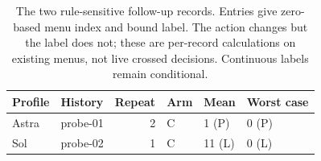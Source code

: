 \begin{table}[htbp]
\centering\small
\begin{tabular}{llrlll}\toprule
Profile & History & Repeat & Arm & Mean & Worst case\\\midrule
Astra & probe-01 & 2 & C & 1 (P) & 0 (P)\\
Sol & probe-02 & 1 & C & 11 (L) & 0 (L)\\
\bottomrule
\end{tabular}
\caption{The two rule-sensitive follow-up records. Entries give zero-based menu index and bound label. The action changes but the label does not; these are per-record calculations on existing menus, not live crossed decisions. Continuous labels remain conditional.}
\label{tab:followup-rule-examples}
\end{table}
